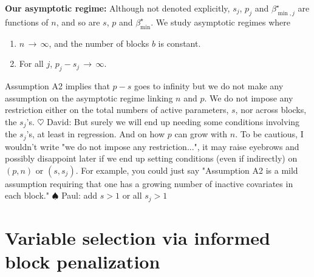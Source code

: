 \documentclass[aos]{imsart}
\theoremstyle{plain}
\newcommand{\david}[1]{{\small{\color{blue} \sf $\heartsuit$ David: #1}}}
\newcommand{\paul}[1]{{\small{\color{green} \sf $\spadesuit$ Paul: #1}}}
\begin{document}
\noindent\textbf{Our asymptotic regime:} Although not denoted explicitly, $s_j$, $p_j$ and $\beta_{\min,j}^{\star}$ are  functions of $n$, and so are $s$, $p$ and $\beta_{\min}^{\star}$. We study asymptotic regimes where
\begin{enumerate}[start=1,label={(A\arabic*)}]
    \item $n \,\to \, \infty$, and the number of blocks $b$ is constant.
    \item For all $j$, $p_j-s_j \,\to \, \infty$.
\end{enumerate}
Assumption A2 implies that $p-s$ goes to infinity but we do not make any assumption on the asymptotic regime linking $n$ and $p$. We do not impose any restriction either on the total numbers of active parameters, $s$, nor across blocks, the $s_j$'s. 
\david{But surely we will end up needing some conditions involving the $s_j$'s, at least in regression. And on how $p$ can grow with $n$. To be cautious, I wouldn't write "we do not impose any restriction...", it may raise eyebrows and possibly disappoint later if we end up setting conditions (even if indirectly) on $(p,n)$ or $(s,s_j)$. For example, you could just say "Assumption A2 is a mild assumption requiring that one has a growing number of inactive covariates in each block."}\paul{add $s>1$ or all $s_j>1$}


\section{Variable selection via informed block penalization}\label{sec:intro_blockpen}
\end{document}
